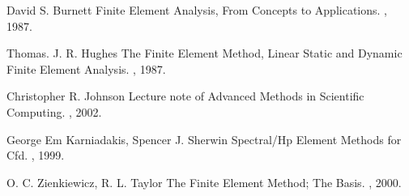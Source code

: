 

\begin{thebibliography}{9}
    David S. Burnett \/
    \newblock Finite Element Analysis, From Concepts to Applications.
    , 1987.

    Thomas. J. R. Hughes \/
    \newblock The Finite Element Method, Linear Static and Dynamic Finite Element Analysis.
    , 1987.

    Christopher R. Johnson \/
    \newblock Lecture note of Advanced Methods in Scientific Computing.
    , 2002.

    George Em Karniadakis, Spencer J. Sherwin \/
    \newblock Spectral/Hp Element Methods for Cfd.
    , 1999.

    O. C. Zienkiewicz, R. L. Taylor \/
    \newblock The Finite Element Method; The Basis.
    , 2000.

\end{thebibliography}

